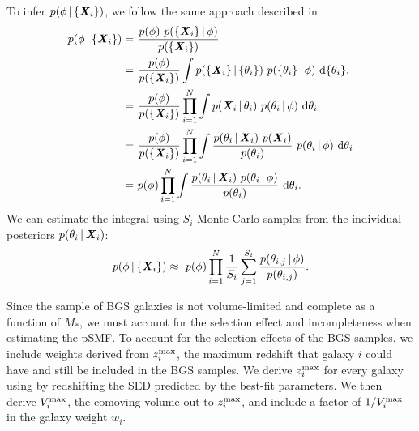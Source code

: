 To infer $p(\phi\,|\,\{{\textbf{\textit{X}}_i}\})$, we follow the same approach described
in \cite{hahn2022}:
\begin{align}\label{eq:popinf}
p(\phi \,|\, \{{\textbf{\textit{X}}_i}\}) 
    =&~\frac{p(\phi)~p( \{{\textbf{\textit{X}}_i}\} \,|\, \phi)}{p(\{{\textbf{\textit{X}}_i}\})}\\
    =&~\frac{p(\phi)}{p(\{{\textbf{\textit{X}}_i}\})}\int p(\{{\textbf{\textit{X}}_i}\} \,|\, \{\theta_i\})~p(\{\theta_i\} \,|\, \phi)~{\rm d}\{\theta_i\}.\\
    =&~\frac{p(\phi)}{p(\{{\textbf{\textit{X}}_i}\})}\prod\limits_{i=1}^N\int p({\textbf{\textit{X}}_i} \,|\, \theta_i)~p(\theta_i \,|\, \phi)~{\rm d}\theta_i\\
    =&~\frac{p(\phi)}{p(\{{\textbf{\textit{X}}_i}\})}\prod\limits_{i=1}^N\int \frac{p(\theta_i \,|\, {\textbf{\textit{X}}_i})~p({\textbf{\textit{X}}_i})}{p(\theta_i)}~p(\theta_i \,|\, \phi)~{\rm d}\theta_i\\
    =&~p(\phi)\prod\limits_{i=1}^N\int \frac{p(\theta_i \,|\, {\textbf{\textit{X}}_i})~p(\theta_i \,|\, \phi)}{p(\theta_i)}~{\rm d}\theta_i. 
\end{align}
\noindent We can estimate the integral using $S_i$ Monte Carlo samples from
the individual posteriors $p(\theta_i \,|\, {\textbf{\textit{X}}_i})$: 
\begin{align}
    p(\phi \,|\, \{{\textbf{\textit{X}}_i}\}) \approx~p(\phi)\prod\limits_{i=1}^N\frac{1}{S_i}\sum\limits_{j=1}^{S_i}
    \frac{p(\theta_{i,j} \,|\, \phi)}{p(\theta_{i,j})}.
\end{align} 

Since the sample of BGS galaxies is not volume-limited and complete as a
function of $M_*$, we must account for the selection effect and incompleteness
when estimating the pSMF. 
To account for the selection effects of the BGS samples, we include weights
derived from $z^{\rm max}_i$, the maximum redshift that galaxy $i$ could have
and still be included in the BGS samples. 
We derive $z^{\rm max}_i$ for every galaxy using by redshifting the SED
predicted by the best-fit parameters. 
We then derive $V^{\rm max}_i$, the comoving volume out to $z^{\rm max}_i$, and
include a factor of $1/V^{\rm max}_i$ in the galaxy weight $w_i$. 

